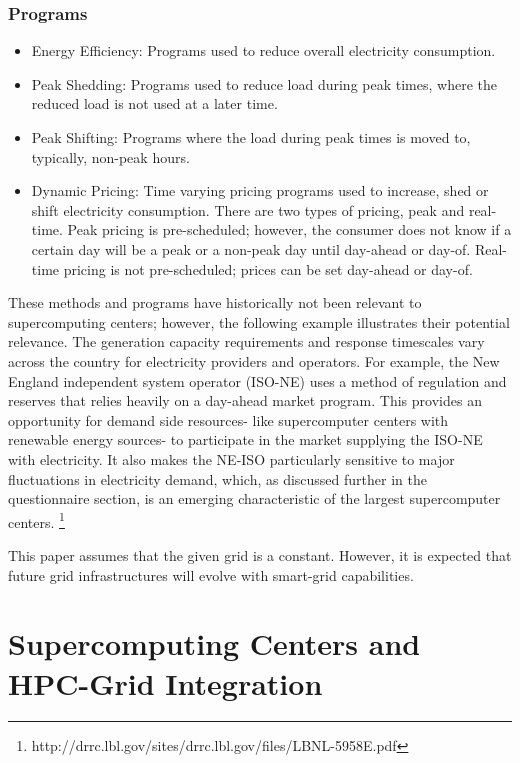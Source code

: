 \subsubsection{Programs}
\begin{itemize}
\item Energy Efficiency:  Programs used to reduce overall electricity consumption.
\item Peak Shedding:  Programs used to reduce load during peak times, 
where the reduced load is not used at a later time. 
\item Peak Shifting:  Programs where the load during peak times is moved to, typically, non-peak hours. 
\item Dynamic Pricing:  Time varying pricing programs used to increase, shed or shift electricity consumption. 
There are two types of pricing, peak and real-time.  Peak pricing is pre-scheduled; however, the consumer 
does not know if a certain day will be a peak or a non-peak day until day-ahead or day-of.  
Real-time pricing is not pre-scheduled; prices can be set day-ahead or day-of.
\end{itemize}

These methods and programs have historically not been relevant to supercomputing centers; however, 
the following example illustrates their potential relevance.
The generation capacity requirements and response timescales vary across the country for electricity 
providers and operators. For example, the New England independent system operator (ISO-NE) uses a method 
of regulation and reserves that relies heavily on a day-ahead market program. This provides an opportunity 
for demand side resources- like supercomputer centers with renewable energy sources- to participate in the 
market supplying the ISO-NE with electricity.  It also makes the NE-ISO particularly sensitive to major 
fluctuations in electricity demand, which, as discussed further in the questionnaire section, is an emerging 
characteristic of the largest supercomputer centers.  
\footnote {http://drrc.lbl.gov/sites/drrc.lbl.gov/files/LBNL-5958E.pdf}

This paper assumes that the given grid is a constant. However, it is expected that future grid infrastructures will 
evolve with smart-grid capabilities. 

\section{Supercomputing Centers and \\ HPC-Grid Integration}

